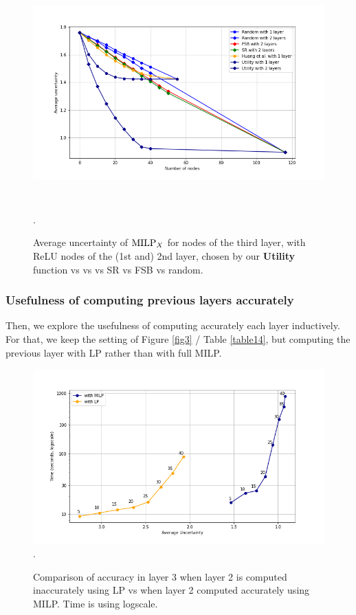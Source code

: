 {	\begin{figure}[h!]
		\centering
		\vspace*{-0.3cm}
		\includegraphics[height=9cm]{New Plot for table 3}.
		\vspace*{-0.4cm}
		\caption{Average uncertainty of ${\textrm{MILP}}_X$ for nodes of the third layer, with ReLU nodes of the (1st and) 2nd layer, chosen by our {\bf Utility} function vs \cite{DivideAndSlide} vs vs SR vs FSB vs random.}
		\label{fig_table3_new}
	\end{figure}




\newpage

\subsubsection*{Usefulness of computing previous layers accurately}	


Then, we explore the usefulness of computing accurately each layer inductively.
For that, we keep the setting of Figure \ref{fig3} / Table \ref{table14}, but computing the previous layer with LP rather than with full MILP.


\begin{figure}[h!]
	\hspace*{-0.8cm}
	\includegraphics[scale=0.6]{Layer3_comparison_LP}.
	\caption{Comparison of accuracy in layer 3 when layer 2 is computed inaccurately using LP vs when layer 2 computed accurately using MILP.
	Time is using logscale.}
	\label{fig3LP}
\end{figure}








}
